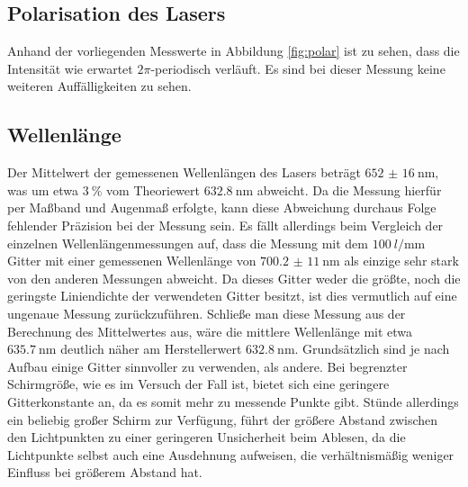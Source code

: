 \subsection{Polarisation des Lasers}

Anhand der vorliegenden Messwerte in Abbildung \ref{fig:polar} ist zu sehen, dass die Intensität wie erwartet $2\pi$-periodisch verläuft. Es sind bei dieser 
Messung keine weiteren Auffälligkeiten zu sehen. 

\subsection{Wellenlänge}

Der Mittelwert der gemessenen Wellenlängen des Lasers beträgt $\SI{652(16)}{\nano\m}$, was um etwa $\SI{3}{\percent}$ vom Theoriewert $\SI{632.8}{\nano\m}$ 
abweicht. Da die Messung hierfür per Maßband und Augenmaß erfolgte, kann diese Abweichung durchaus Folge fehlender Präzision bei der Messung sein. 
Es fällt allerdings beim Vergleich der einzelnen Wellenlängenmessungen auf, dass die Messung mit dem $\SI{100}{l/\mm}$ Gitter mit einer gemessenen Wellenlänge 
von $\SI{700,2(11)}{\nano\m}$ als einzige sehr stark von den anderen Messungen abweicht. Da dieses Gitter weder die größte, noch die geringste Liniendichte der 
verwendeten Gitter besitzt, ist dies vermutlich auf eine ungenaue Messung zurückzuführen. Schließe man diese Messung aus der Berechnung des Mittelwertes aus, wäre 
die mittlere Wellenlänge mit etwa $\SI{635,7}{\nano\m}$ deutlich näher am Herstellerwert $\SI{632.8}{\nano\m}$. Grundsätzlich sind je nach Aufbau einige Gitter 
sinnvoller zu verwenden, als andere. Bei begrenzter Schirmgröße, wie es im Versuch der Fall ist, bietet sich eine geringere Gitterkonstante an, da es somit mehr 
zu messende Punkte gibt. Stünde allerdings ein beliebig großer Schirm zur Verfügung, führt der größere Abstand zwischen den Lichtpunkten zu einer geringeren Unsicherheit
beim Ablesen, da die Lichtpunkte selbst auch eine Ausdehnung aufweisen, die verhältnismäßig weniger Einfluss bei größerem Abstand hat. 